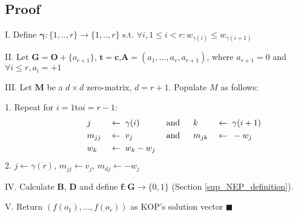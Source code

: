 \documentclass[12pt]{article}	%
\newcommand{\mys }{\hspace{0.1cm}}
\begin{document}
		\subsection{Proof}\label{sup_proof}


				\vspace{5pt}
				\small{\noindent I. Define $\boldsymbol{\gamma}:\{1,..,r\}\rightarrow \{1,..,r\}$ \mys s.t. $\forall i, 1\leq i <r: w_{\gamma(i)} \leq w_{\gamma(i+1)}$

							\noindent II. Let $\boldsymbol{G}=\boldsymbol{O}+\{o_{r+1}\}$, \mys $\boldsymbol{t}=\boldsymbol{c}$,\mys $\boldsymbol{A}=(a_1,\dots,a_r, a_{r+1})$, \mys where \mys $a_{r+1}=0$ \mys and \mys $\forall i\leq r,$\mys$a_i=+1$

							\noindent III. Let $\boldsymbol  {M}$ \mys be a $d\times d$ zero-matrix, $d=r+1$. Populate $M$ as follows:

								\noindent\hspace{20pt}1. Repeat for \mys$i=1$\quad to\quad $i=r-1$:
							\setlength{\belowdisplayskip}{0pt} %
							\begin{alignat*}{7}
										\qquad\qquad & j\mys       & \leftarrow\mys\mys   & \gamma(i)   & \mys\text{and} \quad\mys\mys & k\mys       & \leftarrow\mys\mys   & \gamma(i+1) \\
										\qquad\qquad & m_{jj}\mys  & \leftarrow\mys\mys   & v_j         & \mys\text{and} \quad\mys\mys & m_{jk}\mys  & \leftarrow\mys\mys   & -w_j \\
										\qquad\qquad & w_{k}\mys   & \leftarrow\mys\mys   & w_{k} - w_j & \mys                         &\mys         & \mys                 & \mys
							\end{alignat*}
							\noindent\hspace{20pt}2. $j\leftarrow\gamma(r)$, $m_{jj}\leftarrow v_j$, $m_{dj}\leftarrow -w_j$

							\noindent IV. Calculate $\boldsymbol{B}$, $\boldsymbol{D}$ and define $\boldsymbol{f}:\boldsymbol{G}  \rightarrow \{0,1\}$ (Section \ref{sup_NEP_definition}).

							\noindent V. Return $(f(o_1), \dots, f(o_r))$ as KOP's solution vector \hspace{5pt}$\blacksquare$
						}
\end{document}
